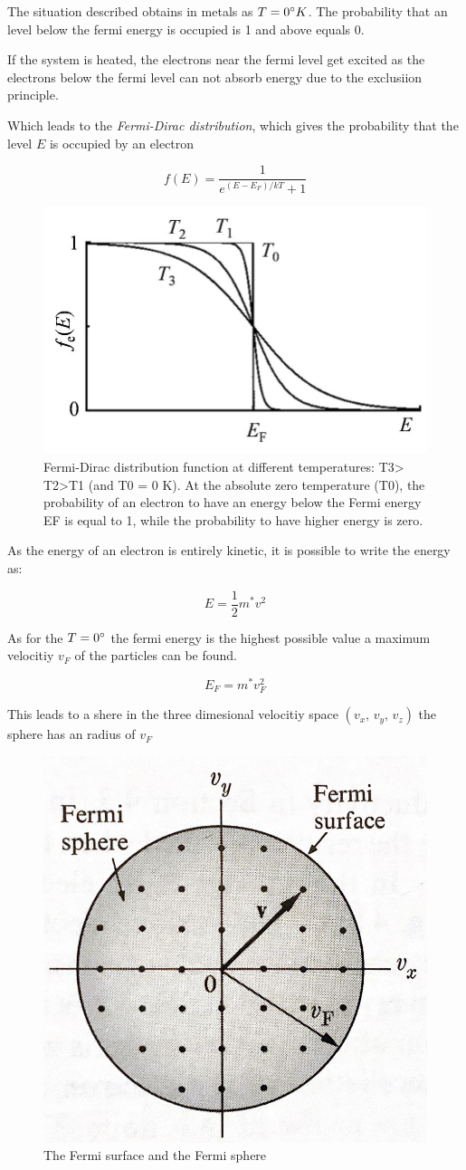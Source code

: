 The situation described obtains in metals as $T=0 \degree K$. The probability that 
an level below the fermi energy is occupied is 1 and above equals 0.

If the system is heated, the electrons near the fermi level get excited as 
the electrons below the fermi level can not absorb energy due to the exclusiion
principle.

Which leads to the \textit{Fermi-Dirac distribution}, which gives
the probability that the level $E$ is occupied by an electron

\begin{equation}
    f(E) = \frac{1}{e^{(E-E_F)/kT}+1}
\end{equation}

\begin{figure}[H]
    \centering
    \includegraphics[width=0.5\linewidth]{Graphics/Chapter1/Fermi-Dirac-distribution.png}
    \caption{Fermi-Dirac distribution function at different temperatures: T3> T2>T1
     (and T0 = 0 K). At the absolute zero temperature (T0), the probability of an 
     electron to have an energy below the Fermi energy EF is equal to 1, while the 
     probability to have higher energy is zero. \cite{fermi_dist}}
    \label{}
\end{figure}

As the energy of an electron is entirely kinetic, it is possible
to write the energy as:

$$E = \frac{1}{2} m^* v^2$$

As for the $T=0 \degree$ the fermi energy is the highest possible value
a maximum velocitiy $v_F$ of the particles can be found. 

$$E_F = m^*v_F^2$$

This leads to a shere in the three dimesional velocitiy space
$(v_x, \, v_y, \, v_z)$ the sphere has an radius of $v_F$


\begin{figure}[H]
    \centering
    \includegraphics[width=0.4\linewidth]{Graphics/Chapter1/Fermi_Sphere.png}
    \caption{The Fermi surface and the Fermi sphere \cite[Elementary Solid State Physics p. 268]{elementary_SSP} }
    \label{}
\end{figure}

